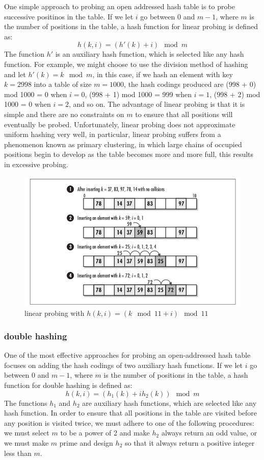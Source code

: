 \documentclass{article}
\begin{document}
    One simple approach to probing an open addressed hash table is to probe successive positinos in the table. If we let $i$ go between 0 and $m - 1$, where $m$ is the number of positions in the table, a hash function for linear probing is defined as:
    $$
    h(k,i) = (h'(k) + i) \mod m
    $$
    The function $h'$ is an auxiliary hash function, which is selected like any hash function. For example, we might choose to use the division method of hashing and let $h'(k) = k \mod m$, in this case, if we hash an element with key $k = 2998$ into a table of size $m = 1000$, the hash codings produced are (998 + 0) mod 1000 = 0 when $i = 0$, (998 + 1) mod 1000 = 999 when $i = 1$, (998 + 2) mod 1000 = 0 when $i = 2$, and so on. The advantage of linear probing is that it is simple and there are no constraints on $m$ to ensure that all positions will eventually be probed. Unfortunately, linear probing does not approximate uniform hashing very well, in particular, linear probing suffers from a phenomenon known as primary clustering, in which large chains of occupied positions begin to develop as the table becomes more and more full, this results in excessive probing.
    \begin{figure}[h]
    \centering
    \includegraphics[width=0.5\linewidth]{images/hash-tables-2}
    \caption{linear probing with $h(k,i) = (k \mod 11 + i) \mod 11$}
    \end{figure}

    \subsubsection{double hashing}

    One of the most effective approaches for probing an open-addressed hash table focuses on adding the hash codings of two auxiliary hash functions. If we let $i$ go between 0 and $m - 1$, where $m$ is the number of positions in the table, a hash function for double hashing is defined as:
    $$
    h(k,i) = (h_1(k) + ih_2(k)) \mod m
    $$
    The functions $h_1$ and $h_2$ are auxiliary hash functions, which are selected like any hash function. In order to ensure that all positions in the table are visited before any position is visited twice, we must adhere to one of the following procedures: we must select $m$ to be a power of 2 and make $h_2$ always return an odd value, or we must make $m$ prime and design $h_2$ so that it always return a positive integer less than $m$.
\end{document}
